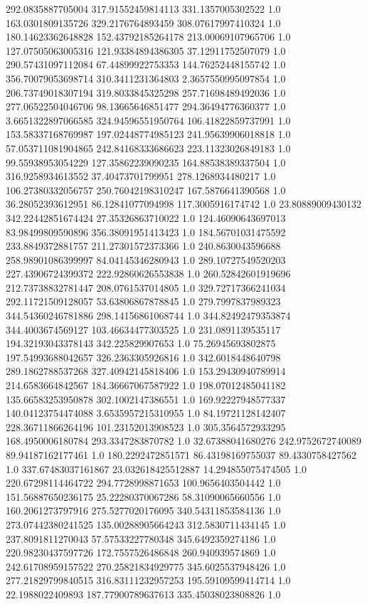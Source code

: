 292.0835887705004	317.91552459814113	331.1357005302522	1.0
163.0301809135726	329.2176764893459	308.07617997410324	1.0
180.14623362648828	152.43792185264178	213.00069107965706	1.0
127.07505063005316	121.93384894386305	37.12911752507079	1.0
290.57431097112084	67.44899922753353	144.76252448155742	1.0
356.70079053698714	310.3411231364803	2.3657550995097854	1.0
206.73749018307194	319.8033845325298	257.71698489492036	1.0
277.06522504046706	98.13665646851477	294.36494776360377	1.0
3.6651322897066585	324.94596551950764	106.41822859737991	1.0
153.58337168769987	197.02448774985123	241.95639906018818	1.0
57.053711081904865	242.84168333686623	223.11323026849183	1.0
99.55938953054229	127.35862239090235	164.88538389337504	1.0
316.9258934613552	37.40473701799951	278.1268934480217	1.0
106.27380332056757	250.76042198310247	167.5876641390568	1.0
36.28052393612951	86.12841077094998	117.3005916174742	1.0
23.80889009430132	342.22442851674424	27.35326863710022	1.0
124.46090643697013	83.98499809590896	356.38091951413423	1.0
184.56701031475592	233.8849372881757	211.27301572373366	1.0
240.8630043596688	258.98901086399997	84.04145346280943	1.0
289.10727549520203	227.43906724399372	222.92860626553838	1.0
260.52842601919696	212.73738832781447	208.0761537014805	1.0
329.72717366241034	292.11721509128057	53.63806867878845	1.0
279.7997837989323	344.54360246781886	298.14156861068744	1.0
344.82492479353874	344.4003674569127	103.46634477303525	1.0
231.0891139535117	194.32193043378143	342.225829907653	1.0
75.26945693802875	197.54993688042657	326.2363305926816	1.0
342.6018448640798	289.1862788537268	327.40942145818406	1.0
153.29430940789914	214.6583664842567	184.36667067587922	1.0
198.07012485041182	135.66583253950878	302.1002147386551	1.0
169.92227948577337	140.04123754474088	3.6535957215310955	1.0
84.19721128142407	228.36711866264196	101.23152013908523	1.0
305.3564572933295	168.4950006180784	293.3347283870782	1.0
32.67388041680276	242.9752672740089	89.94187162177461	1.0
180.2292472851571	86.43198169755037	89.4330758427562	1.0
337.67483037161867	23.032618425512887	14.294855075474505	1.0
220.67298114464722	294.7728998871653	100.9656403504442	1.0
151.56887650236175	25.22280370067286	58.31090065660556	1.0
160.2061273797916	275.5277020176095	340.54311853584136	1.0
273.07442380241525	135.00288905664243	312.5830711434145	1.0
237.8091811270043	57.57533227780348	345.6492359274186	1.0
220.98230437597726	172.7557526486848	260.940939574869	1.0
242.61708959157522	270.25821834929775	345.6025537948426	1.0
277.21829799840515	316.83111232957253	195.59109599414714	1.0
22.1988022409893	187.77900789637613	335.45038023808826	1.0
